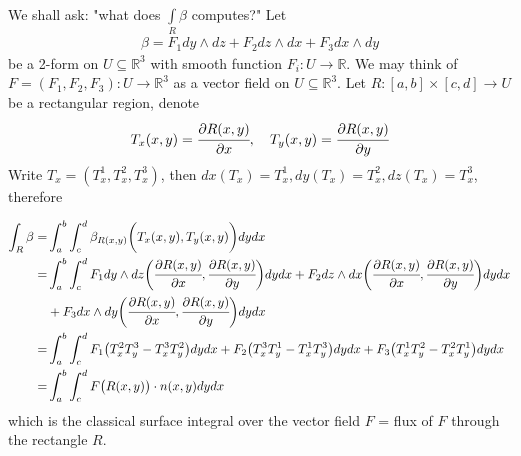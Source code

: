 \documentclass[10pt]{article}
\begin{document}
            We shall ask: "what does $\int\limits_{R}\beta$ computes?" Let 
            \begin{equation*}
                \begin{aligned}
                    \beta = F_1dy\wedge dz + F_2dz\wedge dx + F_3dx\wedge dy
                \end{aligned}
            \end{equation*}
            be a 2-form on $U\subseteq\mathbb{R}^3$ with smooth function $F_i: U\rightarrow\mathbb{R}$. We may think of $F=(F_1, F_2, F_3): U\rightarrow\mathbb{R}^3$ as a vector field on $U\subseteq\mathbb{R}^3$. Let $R: [a,b]\times[c,d]\rightarrow U$ be a rectangular region, denote 
            \begin{equation*}
                \begin{aligned}
                    T_x(x,y) = \cfrac{\partial R(x,y)}{\partial x}, \quad T_y(x,y) = \cfrac{\partial R(x,y)}{\partial y}
                \end{aligned}
            \end{equation*}
            Write $T_x = (T_x^1, T_x^2, T_x^3)$, then $dx(T_x) = T_x^1, dy(T_x) = T_x^2, dz(T_x) = T_x^3$, therefore
            
		\begin{equation*}
			\begin{aligned}
				\int_{R}\beta = &\int_{a}^{b}\int_{c}^{d}\beta_{R(x,y)}\bigg( T_x(x, y), T_y(x, y) \bigg) dydx \\
				= &\int_{a}^{b}\int_{c}^{d}F_1dy\wedge dz\bigg( \cfrac{\partial R(x,y)}{\partial x}, \cfrac{\partial R(x,y)}{\partial y} \bigg) dydx + F_2dz\wedge dx\bigg( \cfrac{\partial R(x,y)}{\partial x}, \cfrac{\partial R(x,y)}{\partial y} \bigg) dydx \\
				&+ F_3dx\wedge dy\bigg( \cfrac{\partial R(x,y)}{\partial x}, \cfrac{\partial R(x,y)}{\partial y} \bigg) dydx \\
				= &\int_{a}^{b}\int_{c}^{d}F_1\big( T_x^2T_y^3 - T_x^3T_y^2 \big) dydx + F_2\big( T_x^3T_y^1 - T_x^1T_y^3 \big) dydx + F_3\big( T_x^1T_y^2 - T_x^2T_y^1 \big) dydx \\
				= &\int_{a}^{b}\int_{c}^{d}F\big(R(x,y)\big)\cdot n(x,y)dydx
			\end{aligned}
		\end{equation*}
		which is the classical surface integral over the vector field $F$ = flux of $F$ through the rectangle $R$.
		
\end{document}
